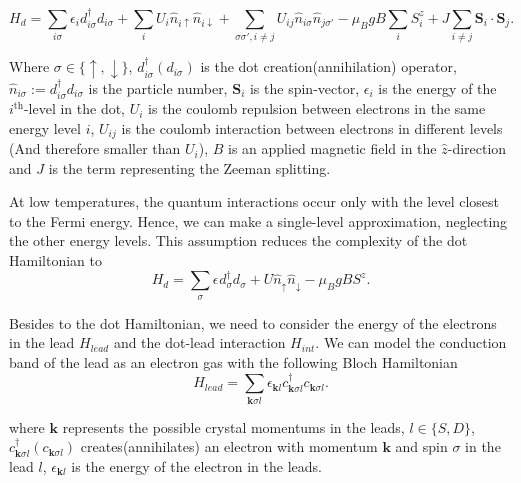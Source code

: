\begin{equation}
H_{d}=\sum_{i\sigma}\epsilon_{i}d_{i\sigma}^{\dagger}d_{i\sigma}+\sum_{i}U_{i}\hat{n}_{i\uparrow}\hat{n}_{i\downarrow}+\sum_{\sigma\sigma',i\neq j}U_{ij}\hat{n}_{i\sigma}\hat{n}_{j\sigma'}-\mu_{B}gB\sum_{i}S_{i}^{z}+J\sum_{i\neq j}\mathbf{S}_{i}\cdot\mathbf{S}_{j}.
\end{equation}




\noindent Where $\sigma\in\{\uparrow,\downarrow\}$, $d_{i\sigma}^{\dagger}\left(d_{i\sigma}\right)$
is the dot creation(annihilation) operator,$\hat{n}_{i\sigma}:=d_{i\sigma}^{\dagger}d_{i\sigma}$
is the particle number, $\mathbf{S}_{i}$ is the spin-vector, $\epsilon_{i}$
is the energy of the $i^{\mbox{th}}$-level in the dot, $U_{i}$ is
the coulomb repulsion between electrons in the same energy level $i$,
$U_{ij}$ is the coulomb interaction between electrons in different
levels (And therefore smaller than $U_{i}$), \textbf{$B$} is an
applied magnetic field in the $\hat{z}$-direction and $J$ is the
term representing the Zeeman splitting. 

At low temperatures, the quantum interactions occur only with the level closest to the Fermi energy. Hence, we can make a single-level approximation, neglecting the other energy levels. This assumption reduces the complexity of the dot Hamiltonian to \\


\begin{equation}
    H_{d}=\sum_{\sigma}\epsilon_{}d_{\sigma}^{\dagger}d_{\sigma}+U\hat{n}_{\uparrow}\hat{n}_{\downarrow}-\mu_{B}gBS^{z}. \label{eq:hdot}
\end{equation}

Besides to the dot Hamiltonian, we need to consider the energy of the electrons in the lead $H_{lead}$ and the dot-lead interaction $H_{int}$. We can model  the conduction band of the lead as an electron gas with the following Bloch Hamiltonian
\begin{equation}
H_{lead}  =  \sum_{\mathbf{k}\sigma l}\epsilon_{\mathbf{k}l}c_{\mathbf{k}\sigma l}^{\dagger}c_{\mathbf{k}\sigma l}. 
\end{equation}

\noindent where $\mathbf{k}$ represents the possible crystal momentums in the
leads, $l\in\{S,D\}$, $c_{\mathbf{k}\sigma l}^{\dagger}(c_{\mathbf{k}\sigma l})$
creates(annihilates) an electron with momentum $\mathbf{k}$ and spin
$\sigma$ in the lead $l$, $\epsilon_{\mathbf{k}l}$ is the energy
of the electron in the leads. 

